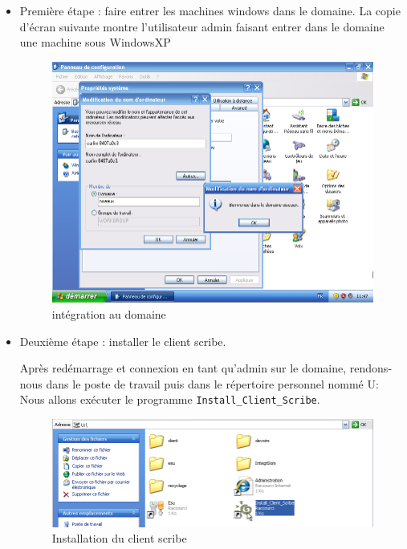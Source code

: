 \documentclass{article}
\makeatletter
\def\maxwidth{\ifdim\Gin@nat@width>\linewidth\linewidth
\else\Gin@nat@width\fi}
\let\Oldincludegraphics\includegraphics
\renewcommand{\includegraphics}[1]{\Oldincludegraphics[width=\maxwidth]{#1}}
\makeatother
\begin{document}
\begin{itemize}
\item
  Première étape : faire entrer les machines windows dans le domaine. La
  copie d'écran suivante montre l'utilisateur admin faisant entrer dans
  le domaine une machine sous WindowsXP

  \begin{figure}[htbp]
  \centering
  \includegraphics{scribe_html_78aacfe6.png}
  \caption{intégration au domaine}
  \end{figure}
\item
  Deuxième étape : installer le client scribe.

  Après redémarrage et connexion en tant qu'admin sur le domaine,
  rendons-nous dans le poste de travail puis dans le répertoire
  personnel nommé U: Nous allons exécuter le programme
  \lstinline!Install_Client_Scribe!.

  \begin{figure}[htbp]
  \centering
  \includegraphics{scribe_html_m4358be12.png}
  \caption{Installation du client scribe}
  \end{figure}
\end{itemize}
\end{document}
